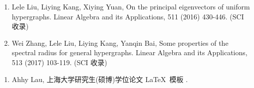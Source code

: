 \begin{publications}
    \begin{enumerate}
        \item Lele Liu, Liying Kang, Xiying Yuan,
              On the principal eigenvectors of uniform hypergraphs.
              Linear Algebra and its Applications, 511 (2016) 430-446. (SCI 收录)

        \item Wei Zhang, Lele Liu, Liying Kang, Yanqin Bai,
              Some properties of the spectral radius for general hypergraphs.
              Linear Algebra and its Applications, 513 (2017) 103-119. (SCI 收录)
    \end{enumerate}

    \begin{enumerate}
        \item Ahhy Lau, 上海大学研究生(硕博)学位论文 \LaTeX\ 模板 \shuthesis.
    \end{enumerate}
\end{publications}